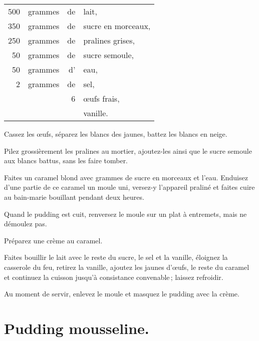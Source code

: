 \footnotesize
\begin{longtable}{rrrp{16em}}
    500 & grammes & de & lait,                                                                            \\
    350 & grammes & de & sucre en morceaux,                                                               \\
    250 & grammes & de & pralines grises,                                                                 \\
     50 & grammes & de & sucre semoule,                                                                   \\
     50 & grammes & d' & eau,                                                                             \\
      2 & grammes & de & sel,                                                                             \\
        &         &  6 & œufs frais,                                                                      \\
        &         &    & vanille.                                                                         \\
\end{longtable}
\normalsize

Cassez les œufs, séparez les blancs des jaunes, battez les blancs en neige.

Pilez grossièrement les pralines au mortier, ajoutez-les ainsi que le sucre
semoule aux blancs battus, sans les faire tomber.

Faites un caramel blond avec {\mmm} grammes de sucre en morceaux et
l'eau. Enduisez d'une partie de ce caramel un moule uni, versez‑y l'appareil
praliné et faites cuire au bain-marie bouillant pendant deux heures.

Quand le pudding est cuit, renversez le moule sur un plat à entremets, mais
ne démoulez pas.

Préparez une crème au caramel.

Faites bouillir le lait avec le reste du sucre, le sel et la vanille, éloignez
la casserole du feu, retirez la vanille, ajoutez les jaunes d'œufs, le reste du
caramel et continuez la cuisson jusqu'à consistance convenable ; laissez
refroidir.

Au moment de servir, enlevez le moule et masquez le pudding avec la crème.

\section*{\centering Pudding mousseline.}
{}

